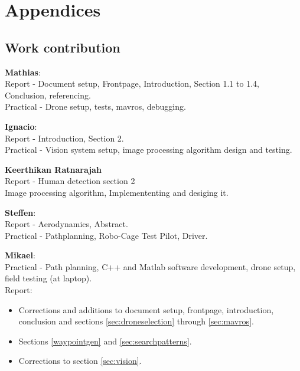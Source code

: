 \part*{Appendices}
\appendix
\chapter{Work contribution}
\label{app:work}
\textbf{Mathias}:\\
Report - Document setup, Frontpage,  Introduction, Section  1.1 to 1.4, Conclusion, referencing.\\
Practical - Drone setup, tests, mavros, debugging.

\textbf{Ignacio}:\\
Report - Introduction, Section  2.\\
Practical - Vision system setup, image processing algorithm design and testing.

\textbf{Keerthikan Ratnarajah}\\
Report - Human detection section 2\\
Image processing algorithm, Implemententing and desiging it.
 
\textbf{Steffen}:\\
Report - Aerodynamics, Abstract.\\
Practical - Pathplanning, 
Robo-Cage Test Pilot, Driver.

\textbf{Mikael}:\\
Practical - Path planning, C++ and Matlab software development, drone setup, field testing (at laptop).\\
Report:
\begin{itemize}
\item Corrections and additions to document setup, frontpage, introduction, conclusion and sections \ref{sec:droneselection} through \ref{sec:mavros}.
\item Sections \ref{waypointgen} and \ref{sec:searchpatterns}.
\item Corrections to section \ref{sec:vision}.
\end{itemize}

